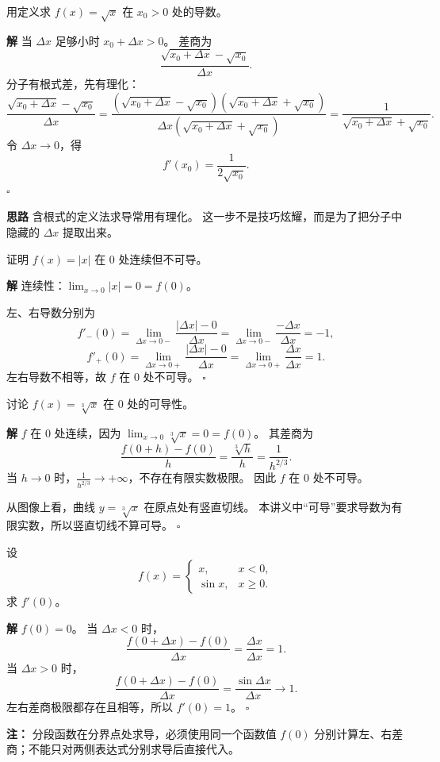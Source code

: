 \documentclass[fontset=fandol]{ctexart}
\newenvironment{solution}{\par\noindent\textbf{解}\quad}{\hfill$\square$\par\vspace{0.8em}}
\newenvironment{idea}{\par\noindent\textbf{思路}\quad}{\par\vspace{0.4em}}
\newenvironment{warning}{\par\noindent\textbf{注：}\quad}{\par\vspace{0.8em}}
\begin{document}
\begin{example}[用定义求根式函数的导数]
用定义求 $f(x)=\sqrt{x}$ 在 $x_0>0$ 处的导数。
\end{example}
\begin{solution}
当 $\Delta x$ 足够小时 $x_0+\Delta x>0$。 差商为
\[
\frac{\sqrt{x_0+\Delta x}-\sqrt{x_0}}{\Delta x}.
\]
分子有根式差，先有理化：
\[
\frac{\sqrt{x_0+\Delta x}-\sqrt{x_0}}{\Delta x}
=\frac{(\sqrt{x_0+\Delta x}-\sqrt{x_0})(\sqrt{x_0+\Delta x}+\sqrt{x_0})}{\Delta x(\sqrt{x_0+\Delta x}+\sqrt{x_0})}
=\frac1{\sqrt{x_0+\Delta x}+\sqrt{x_0}}.
\]
令 $\Delta x\to0$，得
\[
f'(x_0)=\frac1{2\sqrt{x_0}}.
\]
\end{solution}
\begin{idea}
含根式的定义法求导常用有理化。 这一步不是技巧炫耀，而是为了把分子中隐藏的 $\Delta x$ 提取出来。
\end{idea}

\begin{example}[连续但不可导]
证明 $f(x)=|x|$ 在 $0$ 处连续但不可导。
\end{example}
\begin{solution}
连续性：$\lim_{x\to0}|x|=0=f(0)$。

左、右导数分别为
\[
f'_-(0)=\lim_{\Delta x\to0-}\frac{|\Delta x|-0}{\Delta x}
=\lim_{\Delta x\to0-}\frac{-\Delta x}{\Delta x}=-1,
\]
\[
f'_+(0)=\lim_{\Delta x\to0+}\frac{|\Delta x|-0}{\Delta x}
=\lim_{\Delta x\to0+}\frac{\Delta x}{\Delta x}=1.
\]
左右导数不相等，故 $f$ 在 $0$ 处不可导。
\end{solution}

\begin{example}[竖切线与有限导数]
讨论 $f(x)=\sqrt[3]{x}$ 在 $0$ 处的可导性。
\end{example}
\begin{solution}
$f$ 在 $0$ 处连续，因为 $\lim_{x\to0}\sqrt[3]{x}=0=f(0)$。 其差商为
\[
\frac{f(0+h)-f(0)}{h}=\frac{\sqrt[3]{h}}{h}=\frac1{h^{2/3}}.
\]
当 $h\to0$ 时，$\frac1{h^{2/3}}\to+\infty$，不存在有限实数极限。 因此 $f$ 在 $0$ 处不可导。

从图像上看，曲线 $y=\sqrt[3]{x}$ 在原点处有竖直切线。 本讲义中“可导”要求导数为有限实数，所以竖直切线不算可导。
\end{solution}

\begin{example}[分段函数在衔接点的导数]
设
\[
f(x)=
\begin{cases}
x,&x<0,\\
\sin x,&x\geq0.
\end{cases}
\]
求 $f'(0)$。
\end{example}
\begin{solution}
$f(0)=0$。 当 $\Delta x<0$ 时，
\[
\frac{f(0+\Delta x)-f(0)}{\Delta x}=\frac{\Delta x}{\Delta x}=1.
\]
当 $\Delta x>0$ 时，
\[
\frac{f(0+\Delta x)-f(0)}{\Delta x}=\frac{\sin\Delta x}{\Delta x}\to1.
\]
左右差商极限都存在且相等，所以 $f'(0)=1$。
\end{solution}
\begin{warning}
分段函数在分界点处求导，必须使用同一个函数值 $f(0)$ 分别计算左、右差商；不能只对两侧表达式分别求导后直接代入。
\end{warning}
\end{document}
